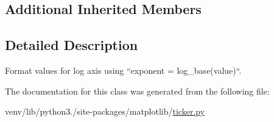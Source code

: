 \subsection*{Additional Inherited Members}


\subsection{Detailed Description}
\begin{DoxyVerb}Format values for log axis using ``exponent = log_base(value)``.
\end{DoxyVerb}
 

The documentation for this class was generated from the following file\+:\begin{DoxyCompactItemize}
\item 
venv/lib/python3./site-\/packages/matplotlib/\hyperlink{ticker_8py}{ticker.\+py}\end{DoxyCompactItemize}
